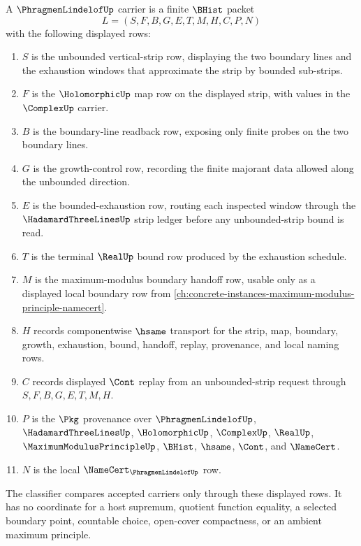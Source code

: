 \begin{definition}
\label{def:phragmen-lindelof-carrier}
A $\PhragmenLindelofUp$ carrier is a finite $\BHist$ packet
$$
L=(S,F,B,G,E,T,M,H,C,P,N)
$$
with the following displayed rows:
\begin{enumerate}
\item $S$ is the unbounded vertical-strip row, displaying the two boundary lines and the exhaustion windows that approximate the strip by bounded sub-strips.
\item $F$ is the $\HolomorphicUp$ map row on the displayed strip, with values in the $\ComplexUp$ carrier.
\item $B$ is the boundary-line readback row, exposing only finite probes on the two boundary lines.
\item $G$ is the growth-control row, recording the finite majorant data allowed along the unbounded direction.
\item $E$ is the bounded-exhaustion row, routing each inspected window through the $\HadamardThreeLinesUp$ strip ledger before any unbounded-strip bound is read.
\item $T$ is the terminal $\RealUp$ bound row produced by the exhaustion schedule.
\item $M$ is the maximum-modulus boundary handoff row, usable only as a displayed local boundary row from \autoref{ch:concrete-instances-maximum-modulus-principle-namecert}.
\item $H$ records componentwise $\hsame$ transport for the strip, map, boundary, growth, exhaustion, bound, handoff, replay, provenance, and local naming rows.
\item $C$ records displayed $\Cont$ replay from an unbounded-strip request through $S,F,B,G,E,T,M,H$.
\item $P$ is the $\Pkg$ provenance over $\PhragmenLindelofUp$, $\HadamardThreeLinesUp$, $\HolomorphicUp$, $\ComplexUp$, $\RealUp$, $\MaximumModulusPrincipleUp$, $\BHist$, $\hsame$, $\Cont$, and $\NameCert$.
\item $N$ is the local $\NameCert_{\PhragmenLindelofUp}$ row.
\end{enumerate}
The classifier compares accepted carriers only through these displayed rows. It has no coordinate for a host supremum, quotient function equality, a selected boundary point, countable choice, open-cover compactness, or an ambient maximum principle.
\end{definition}

